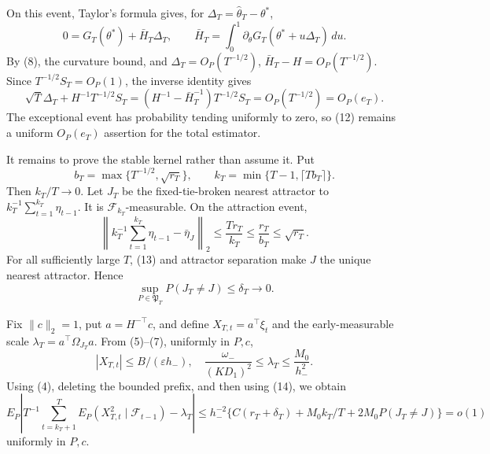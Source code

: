 On this event, Taylor's formula gives, for \(\Delta_T=\widehat\theta_T-\theta^*\),
\[
 0=G_T(\theta^*)+\bar H_T\Delta_T,
 \qquad
 \bar H_T=\int_0^1\partial_\theta G_T(\theta^*+u\Delta_T)\,du.
\]
By (8), the curvature bound, and \(\Delta_T=O_P(T^{-1/2})\), \(\bar H_T-H=O_P(T^{-1/2})\).  Since \(T^{-1/2}S_T=O_P(1)\), the inverse identity gives
\[
 \sqrt T\Delta_T+H^{-1}T^{-1/2}S_T
 =(H^{-1}-\bar H_T^{-1})T^{-1/2}S_T=O_P(T^{-1/2})=O_P(e_T).               \tag{12}
\]
The exceptional event has probability tending uniformly to zero, so (12) remains a uniform \(O_P(e_T)\) assertion for the total estimator.

It remains to prove the stable kernel rather than assume it.  Put
\[
 b_T=\max\{T^{-1/2},\sqrt{r_T}\},
 \qquad
 k_T=\min\{T-1,\lceil Tb_T\rceil\}.
\]
Then \(k_T/T\to0\).  Let \(J_T\) be the fixed-tie-broken nearest attractor to \(k_T^{-1}\sum_{t=1}^{k_T}\eta_{t-1}\).  It is \(\mathcal F_{k_T}\)-measurable.  On the attraction event,
\[
 \left\|k_T^{-1}\sum_{t=1}^{k_T}\eta_{t-1}-\bar\eta_J\right\|_2
 \le \frac{Tr_T}{k_T}\le\frac{r_T}{b_T}\le\sqrt{r_T}.                 \tag{13}
\]
For all sufficiently large \(T\), (13) and attractor separation make \(J\) the unique nearest attractor.  Hence
\[
 \sup_{P\in\mathfrak P_T}P(J_T\ne J)\le\delta_T\longrightarrow0.        \tag{14}
\]

Fix \(\|c\|_2=1\), put \(a=H^{-\top}c\), and define \(X_{T,t}=a^\top\xi_t\) and the early-measurable scale \(\lambda_T=a^\top\Omega_{J_T}a\).  From (5)--(7), uniformly in \(P,c\),
\[
 |X_{T,t}|\le B/(\varepsilon h_-),
 \quad
 \frac{\omega_-}{(KD_1)^2}\le\lambda_T\le\frac{M_0}{h_-^2}.            \tag{15}
\]
Using (4), deleting the bounded prefix, and then using (14), we obtain
\[
 E_P\left|T^{-1}\sum_{t=k_T+1}^TE_P(X_{T,t}^2\mid\mathcal F_{t-1})-\lambda_T\right|
 \le h_-^{-2}\{C(r_T+\delta_T)+M_0k_T/T+2M_0P(J_T\ne J)\}=o(1)          \tag{16}
\]
uniformly in \(P,c\).

